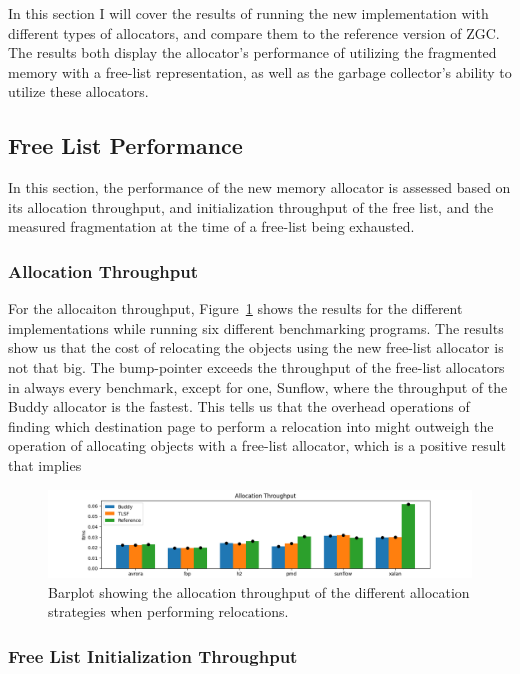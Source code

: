 
In this section I will cover the results of running the new implementation with different types of allocators, and compare them to the reference version of ZGC. The results both display the allocator's performance of utilizing the fragmented memory with a free-list representation, as well as the garbage collector's ability to utilize these allocators.

\subsection{Free List Performance}
In this section, the performance of the new memory allocator is assessed based on its allocation throughput, and initialization throughput of the free list, and the measured fragmentation at the time of a free-list being exhausted.

\subsubsection{Allocation Throughput}
For the allocaiton throughput, Figure~\ref*{fig:allocation-throughput} shows the results for the different implementations while running six different benchmarking programs. The results show us that the cost of relocating the objects using the new free-list allocator is not that big. The bump-pointer exceeds the throughput of the free-list allocators in always every benchmark, except for one, Sunflow, where the throughput of the Buddy allocator is the fastest. This tells us that the overhead operations of finding which destination page to perform a relocation into might outweigh the operation of allocating objects with a free-list allocator, which is a positive result that implies 

\begin{figure}[H]
\centering
\includegraphics[width=1\textwidth]{figures/allocation_throughput.png}
\caption{Barplot showing the allocation throughput of the different allocation strategies when performing relocations.}
\label{fig:allocation-throughput}
\end{figure}

\subsubsection{Free List Initialization Throughput}

